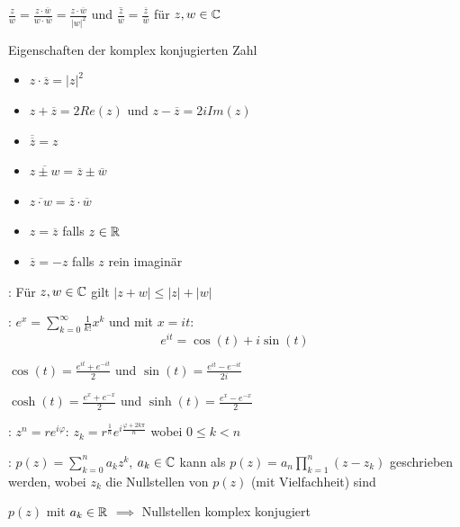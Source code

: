 \Satz $\frac{z}{w} = \frac{z \cdot \overline{w}}{w \cdot \overline{w}} = \frac{z \cdot \overline{w}}{|w|^2}$
und $\overline{\frac{z}{w}} = \frac{\overline{z}}{\overline{w}}$ für $z,w \in \mathbb{C}$

\Satz Eigenschaften der komplex konjugierten Zahl
\vspace{-0.6em}
\begin{itemize}
    \item $z \cdot \overline{z} = |z|^2$
    \item $z + \overline{z} = 2 Re(z)$ und $z - \overline{z} = 2iIm(z)$
    \item $\overline{\overline{z}} = z$
    \item $\overline{z \pm w} = \overline{z} \pm \overline{w}$
    \item $\overline{z \cdot w} = \overline{z} \cdot \overline{w}$
    \item $z = \overline{z}$ falls $z \in \mathbb{R}$
    \item $\overline{z} = -z$ falls $z$ rein imaginär
\end{itemize}

\Satz {}: Für $z, w \in \mathbb{C}$ gilt $|z + w|\le |z| + |w|$

\Satz {}: $e^x = \sum_{k=0}^{\infty}\frac{1}{k!}x^k$ und mit $x = it$:
$$e^{it} = \cos(t) + i\sin(t)$$

\Kor $\cos(t) = \frac{e^{it} + e^{-it}}{2}$ und $\sin(t) = \frac{e^{it} - e^{-it}}{2i}$

\Def $\cosh(t) = \frac{e^x + e^{-x}}{2}$ und $\sinh(t) = \frac{e^x - e^{-x}}{2}$

\Satz {}: $z^n = re^{i\varphi}$: 
$z_k = r^{\frac{1}{n}}e^{i\frac{\varphi + 2k\pi}{n}}$ wobei $0\le k < n$

\Satz {}: $p(z) = \sum_{k=0}^{n} a_k z^k$, $a_k \in \mathbb{C}$
kann als $p(z) = a_n\prod_{k=1}^{n}(z-z_k)$ geschrieben werden, wobei $z_k$ die Nullstellen
von $p(z)$ (mit Vielfachheit) sind

\Satz $p(z)$ mit $a_k \in \mathbb{R}$ $\implies$ Nullstellen komplex konjugiert